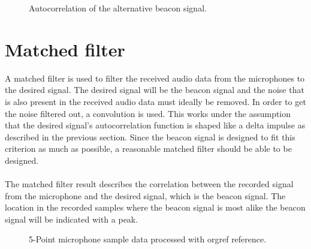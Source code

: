\documentclass[final]{scrreprt} %
\begin{document}
\begin{figure}[H]
	\centering
	\setlength\figureheight{4cm}
    	\setlength{}
	
	\caption{Autocorrelation of the alternative beacon signal.}
	\label{fig:own-correlation}
\end{figure}

\section{Matched filter}
A matched filter is used to filter the received audio data from the microphones to the desired signal.
The desired signal will be the beacon signal and the noise that is also present in the received audio data must ideally be removed.
In order to get the noise filtered out, a convolution is used.
This works under the assumption that the desired signal's autocorrelation function is shaped like a delta impulse as described in the previous section.
Since the beacon signal is designed to fit this criterion as much as possible, a reasonable matched filter should be able to be designed.
\\ \\
The matched filter result describes the correlation between the recorded signal from the microphone and the desired signal, which is the beacon signal.
The location in the recorded samples where the beacon signal is most alike the beacon signal will be indicated with a peak.

\begin{figure}[H]
	\centering
	\setlength\figureheight{2cm}
    	\setlength\figurewidth{0.4\textheight}
	\begin{sideways}
		
	\end{sideways}
	\caption{5-Point microphone sample data processed with orgref reference.}
	\label{fig:default-correlation}
\end{figure}

\iffalse
\begin{figure}[H]
	\centering
	\setlength\figureheight{4cm}
    	\setlength\figurewidth{0.4\linewidth}
	
	\caption{5-Point microphone sample data processed with orgref reference.}
	\label{fig:default-correlation}
\end{figure}

\begin{figure}[H]
	\centering
	\setlength\figureheight{4cm}
    	\setlength\figurewidth{0.4\linewidth}
	
	\caption{5-Point microphone sample data processed with orgref reference.}
	\label{fig:default-correlation}
\end{figure}
\fi
\end{document}

